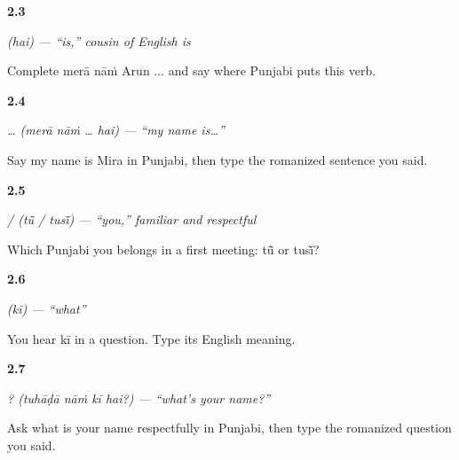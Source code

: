 \noindent\begin{minipage}[t]{\linewidth}
\raggedright
\hypertarget{review-PA-C02-hai-order}{\textbf{2.3}} \emph{ (hai) — \textquotedblleft{}is,\textquotedblright{} cousin of English \emph{is}}\par
\small Complete merā nāṁ Arun ... and say where Punjabi puts this verb.
\end{minipage}\par\medskip

\noindent\begin{minipage}[t]{\linewidth}
\raggedright
\hypertarget{review-PA-C02-mera-naam-hai-speaking}{\textbf{2.4}} \emph{  …  (merā nāṁ … hai) — \textquotedblleft{}my name is…\textquotedblright{}}\par
\small Say my name is Mira in Punjabi, then type the romanized sentence you said.
\end{minipage}\par\medskip

\noindent\begin{minipage}[t]{\linewidth}
\raggedright
\hypertarget{review-PA-C02-tu-tusi-register}{\textbf{2.5}} \emph{ /  (tū̃ / tusī̃) — \textquotedblleft{}you,\textquotedblright{} familiar and respectful}\par
\small Which Punjabi you belongs in a first meeting: tū̃ or tusī̃?
\end{minipage}\par\medskip

\noindent\begin{minipage}[t]{\linewidth}
\raggedright
\hypertarget{review-PA-C02-ki-meaning}{\textbf{2.6}} \emph{ (kī) — \textquotedblleft{}what\textquotedblright{}}\par
\small You hear kī in a question. Type its English meaning.
\end{minipage}\par\medskip

\noindent\begin{minipage}[t]{\linewidth}
\raggedright
\hypertarget{review-PA-C02-tuhada-naam-ki-hai-respectful-question}{\textbf{2.7}} \emph{   ? (tuhāḍā nāṁ kī hai?) — \textquotedblleft{}what's your name?\textquotedblright{}}\par
\small Ask what is your name respectfully in Punjabi, then type the romanized question you said.
\end{minipage}\par\medskip


